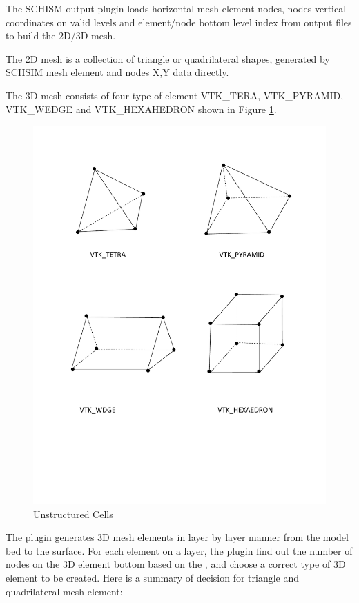 \documentclass[12pt]{report}
\begin{document}
	The SCHISM output plugin loads horizontal mesh element nodes, nodes vertical coordinates on valid levels and element/node bottom level index from output files to build the 2D/3D mesh. 

  The 2D mesh is a collection of triangle or quadrilateral shapes, generated by SCHSIM mesh element and nodes X,Y data directly. 
	
	The 3D mesh consists of four type of element VTK\_TERA, VTK\_PYRAMID, VTK\_WEDGE and VTK\_HEXAHEDRON shown in Figure \ref{figure:3dElements}.
				
       \begin{figure}
        \begin{center}
        \includegraphics[scale=0.75]{Element3D}
        \caption{Unstructured Cells}
        \label{figure:3dElements}
        \end{center}
        \end{figure}
				
	The plugin generates 3D mesh elements in layer by layer manner from the model bed to the surface. For each element on a layer, the plugin find out the number of nodes on the 3D element bottom based on the , and choose a correct type of 3D element to be created. Here is a summary of decision for triangle and
quadrilateral mesh element:
	
\end{document}
